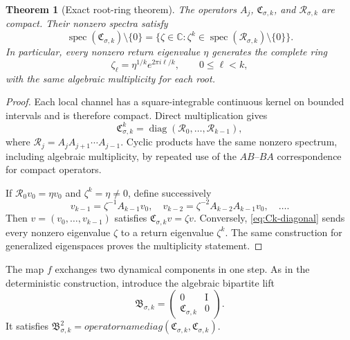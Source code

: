 \documentclass[11pt]{article}
\newtheorem{theorem}{Theorem}[section]
\theoremstyle{definition}
\theoremstyle{remark}
\newcommand{\C}{\mathbb C}
\newcommand{\Id}{\mathrm I}
\newcommand{\cR}{\mathcal R}
\newcommand{\spec}{\operatorname{spec}}
\begin{document}
\begin{theorem}[Exact root-ring theorem]
\label{thm:root-ring}
The operators $A_j$, $\mathfrak C_{\sigma,k}$, and
$\cR_{\sigma,k}$ are compact.  Their nonzero spectra satisfy
\begin{equation}\label{eq:root-spectrum}
 \spec(\mathfrak C_{\sigma,k})\setminus\{0\}
 =\{\zeta\in\C:\zeta^k\in
 \spec(\cR_{\sigma,k})\setminus\{0\}\}.
\end{equation}
In particular, every nonzero return eigenvalue $\eta$ generates the complete
ring
\begin{equation}\label{eq:k-root-ring}
 \zeta_\ell=\eta^{1/k}e^{2\pi i\ell/k},
 \qquad 0\le\ell<k,
\end{equation}
with the same algebraic multiplicity for each root.
\end{theorem}

\begin{proof}
Each local channel has a square-integrable continuous kernel on bounded
intervals and is therefore compact.  Direct multiplication gives
\begin{equation}\label{eq:Ck-diagonal}
 \mathfrak C_{\sigma,k}^k
 =\operatorname{diag}(\cR_0,\ldots,\cR_{k-1}),
\end{equation}
where $\cR_j=A_jA_{j+1}\cdots A_{j-1}$.  Cyclic products have the same
nonzero spectrum, including algebraic multiplicity, by repeated use of the
$AB$--$BA$ correspondence for compact operators.

If $\cR_0v_0=\eta v_0$ and $\zeta^k=\eta\ne0$, define successively
\[
 v_{k-1}=\zeta^{-1}A_{k-1}v_0,
 \quad
 v_{k-2}=\zeta^{-2}A_{k-2}A_{k-1}v_0,
 \quad\ldots.
\]
Then $v=(v_0,\ldots,v_{k-1})$ satisfies
$\mathfrak C_{\sigma,k}v=\zeta v$.  Conversely,
\eqref{eq:Ck-diagonal} sends every nonzero eigenvalue $\zeta$ to a return
eigenvalue $\zeta^k$.  The same construction for generalized eigenspaces
proves the multiplicity statement.
\end{proof}

The map $f$ exchanges two dynamical components in one step.  As in the
deterministic construction, introduce the algebraic bipartite lift
\begin{equation}\label{eq:bipartite-lift}
 \mathfrak B_{\sigma,k}
 =\begin{pmatrix}0&\Id\\ \mathfrak C_{\sigma,k}&0\end{pmatrix}.
\end{equation}
It satisfies
$\mathfrak B_{\sigma,k}^2=operatorname{diag}(\mathfrak C_{\sigma,k},
\mathfrak C_{\sigma,k})$.
\end{document}

